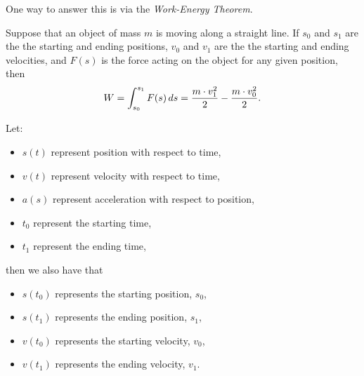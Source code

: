 \documentclass{ximera}
\begin{document}
One way to answer this is via the \textit{Work-Energy Theorem}.

\begin{theorem}
  Suppose that an object of mass $m$ is moving along a straight
  line. If $s_0$ and $s_1$ are the the starting and ending positions,
  $v_0$ and $v_1$ are the the starting and ending velocities, and
  $F(s)$ is the force acting on the object for any given position,
  then
  \[
  W = \int_{s_0}^{s_1} F(s) \,d s = \frac{m\cdot v_1^2}{2} - \frac{m\cdot v_0^2}{2}.
  \]
\begin{explanation}
  Let:
  \begin{itemize}
  \item $s(t)$ represent position with respect to time,
  \item $v(t)$ represent velocity with respect to time,
  \item $a(s)$ represent acceleration with respect to position,
  \item $t_0$ represent the starting time,
  \item $t_1$ represent the ending time,
  \end{itemize}
  then we also have that
  \begin{itemize}
  \item $s(t_0)$ represents the starting position, $s_0$,
  \item $s(t_1)$ represents the ending position, $s_1$,
  \item $v(t_0)$ represents the starting velocity, $v_0$,
  \item $v(t_1)$ represents the ending velocity, $v_1$.
  \end{itemize}
  

\end{explanation}
\end{theorem}
\end{document}
